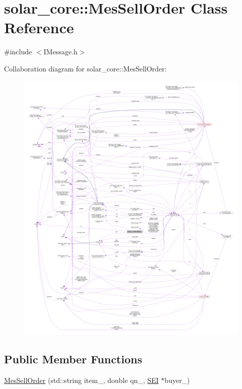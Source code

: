\hypertarget{classsolar__core_1_1_mes_sell_order}{}\section{solar\+\_\+core\+:\+:Mes\+Sell\+Order Class Reference}
\label{classsolar__core_1_1_mes_sell_order}


{\ttfamily \#include $<$I\+Message.\+h$>$}



Collaboration diagram for solar\+\_\+core\+:\+:Mes\+Sell\+Order\+:
\nopagebreak
\begin{figure}[H]
\begin{center}
\leavevmode
\includegraphics[width=350pt]{classsolar__core_1_1_mes_sell_order__coll__graph}
\end{center}
\end{figure}
\subsection*{Public Member Functions}
\begin{DoxyCompactItemize}
\item 
\hyperlink{classsolar__core_1_1_mes_sell_order_adb6422a3f71c86ed02d4ef576fc44899}{Mes\+Sell\+Order} (std\+::string item\+\_\+, double qn\+\_\+, \hyperlink{classsolar__core_1_1_s_e_i}{S\+E\+I} $\ast$buyer\+\_\+)
\end{DoxyCompactItemize}
